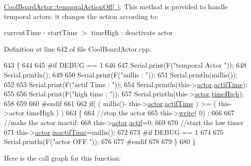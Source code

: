 \hyperlink{class_cool_board_actor_a02698bd647df49cabbe74513d4d88918}{Cool\+Board\+Actor\+::temporal\+Action\+Off( )}\+: This method is provided to handle temporal actors. it changes the action according to\+:

current\+Time -\/ start\+Time $>$ time\+High \+: deactivate actor 

Definition at line 642 of file Cool\+Board\+Actor.\+cpp.


\begin{DoxyCode}
643 \{
644 
645 \textcolor{preprocessor}{#if DEBUG == 1}
646     
647     Serial.print(F(\textcolor{stringliteral}{"temporal Actor  "}));
648     Serial.println();
649 
650     Serial.print(F(\textcolor{stringliteral}{"millis : "}));
651     Serial.println(millis());
652 
653     Serial.print(F(\textcolor{stringliteral}{"actif Time : "}));
654     Serial.println(this->\hyperlink{class_cool_board_actor_a8f190db9f7a39fddbcef7f152da970e9}{actor}.\hyperlink{struct_cool_board_actor_1_1state_a534119a22a09b29ecb446b277d5b2ef5}{actifTime});
655 
656     Serial.print(F(\textcolor{stringliteral}{"high time : "}));
657     Serial.println(this->\hyperlink{class_cool_board_actor_a8f190db9f7a39fddbcef7f152da970e9}{actor}.\hyperlink{struct_cool_board_actor_1_1state_a54cd4976b56aeaa6274fe0576aaebb0f}{timeHigh});
658 
659 
660 \textcolor{preprocessor}{#endif}
661     
662     \textcolor{keywordflow}{if}( ( millis()- this->\hyperlink{class_cool_board_actor_a8f190db9f7a39fddbcef7f152da970e9}{actor}.\hyperlink{struct_cool_board_actor_1_1state_a534119a22a09b29ecb446b277d5b2ef5}{actifTime}  ) >= (  this->actor.timeHigh  ) )
663     \{
664         \textcolor{comment}{//stop the actor}
665         this->\hyperlink{class_cool_board_actor_a958786ff01ea1056ee72c72d439f86da}{write}( 0) ;
666 
667         \textcolor{comment}{//make the actor inactif:}
668         this->\hyperlink{class_cool_board_actor_a8f190db9f7a39fddbcef7f152da970e9}{actor}.\hyperlink{struct_cool_board_actor_1_1state_a7963178c2de01ef0d2861f9f59ad6f3c}{actif}=0;
669 
670         \textcolor{comment}{//start the low timer}
671         this->\hyperlink{class_cool_board_actor_a8f190db9f7a39fddbcef7f152da970e9}{actor}.\hyperlink{struct_cool_board_actor_1_1state_a6d88835f4402b3b81cd404784281854b}{inactifTime}=millis();
672 
673 \textcolor{preprocessor}{    #if DEBUG == 1 }
674 
675         Serial.println(F(\textcolor{stringliteral}{"actor OFF "}));
676     
677 \textcolor{preprocessor}{    #endif}
678                 
679     \}   
680 \}
\end{DoxyCode}
Here is the call graph for this function\+:
